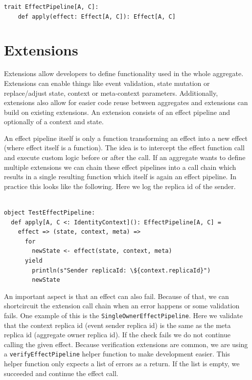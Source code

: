 \documentclass[
	english,
	ruledheaders=section,   %
	class=report,		    %
	thesis={type=bachelor}, %
	accentcolor=9c,			%
	custommargins=true,    %
	marginpar=false,        %
	parskip=half-,          %
	fontsize=11pt,          %
]{tudapub}
\begin{document}
\begin{lstlisting}
trait EffectPipeline[A, C]:
	def apply(effect: Effect[A, C]): Effect[A, C]
\end{lstlisting}

\section{Extensions}
Extensions allow developers to define functionality used in the whole aggregate. Extensions can enable things like event validation, state mutation or replace/adjust state, context or meta-context parameters. Additionally, extensions also allow for easier code reuse between aggregates and extensions can build on existing extensions. An extension consists of an effect pipeline and optionally of a context and state. 

An effect pipeline itself is only a function transforming an effect into a new effect (where effect itself is a function). The idea is to intercept the effect function call and execute custom logic before or after the call. If an aggregate wants to define multiple extensions we can chain these effect pipelines into a call chain which results in a single resulting function which itself is again an effect pipeline. In practice this looks like the following. Here we log the replica id of the sender.

\begin{lstlisting}

object TestEffectPipeline:
  def apply[A, C <: IdentityContext](): EffectPipeline[A, C] =
    effect => (state, context, meta) => 
      for
        newState <- effect(state, context, meta)
      yield
        println(s"Sender replicaId: \${context.replicaId}")
        newState

\end{lstlisting}

An important aspect is that an effect can also fail. Because of that, we can shortcircuit the extension call chain when an error happens or some validation fails. One example of this is the \texttt{SingleOwnerEffectPipeline}. Here we validate that the context replica id (event sender replica id) is the same as the meta replica id (aggregate owner replica id). If the check fails we do not continue calling the given effect. Because verification extensions are common, we are using a \texttt{verifyEffectPipeline} helper function to make development easier. This helper function only expects a list of errors as a return. If the list is empty, we succeeded and continue the effect call.
\end{document}
